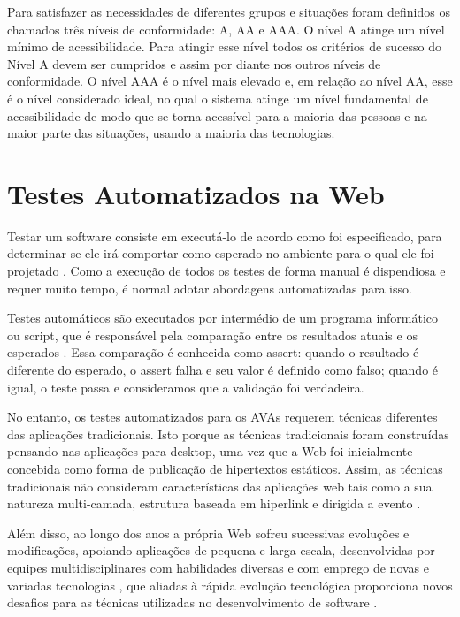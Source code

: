 \documentclass[
	12pt,				%
	openright,			%
	oneside,			%
	a4paper,			%
	chapter=TITLE,		%
	section=TITLE,		%
	subsection=TITLE,	%
	subsubsection=TITLE,%
	english,			%
	brazil				%
	]{abntex2}
\theoremstyle{definition}
\begin{document}
Para satisfazer as necessidades de diferentes grupos e situações foram definidos os chamados três níveis de conformidade: A, AA e AAA. O nível A atinge um nível mínimo de acessibilidade. Para atingir esse nível todos os critérios de sucesso do Nível A devem ser cumpridos e assim por diante nos outros níveis de conformidade. O nível AAA é o nível mais elevado e, em relação ao nível AA, esse é o nível considerado ideal, no qual o sistema atinge um nível fundamental de acessibilidade de modo que se torna acessível para a maioria das pessoas e na maior parte das situações, usando a maioria das tecnologias.

\pagebreak
 
\section{Testes Automatizados na Web}

Testar um software consiste em executá-lo de acordo como foi especificado, para determinar se ele irá comportar como esperado no ambiente para o qual ele foi projetado \cite{izabel2014testes}. Como a execução de todos os testes de forma manual é dispendiosa e requer muito tempo, é normal adotar abordagens automatizadas para isso.

Testes automáticos são executados por intermédio de um programa informático ou script, que é responsável pela comparação entre os resultados atuais e os esperados \cite{sharma2014quantitative}. Essa comparação é conhecida como assert: quando o resultado é diferente do esperado, o assert falha e seu valor é definido como falso; quando é igual, o teste passa e consideramos que a validação foi verdadeira.

No entanto, os testes automatizados para os AVAs requerem técnicas diferentes das aplicações tradicionais. Isto porque as técnicas tradicionais foram construídas pensando nas aplicações para desktop, uma vez que a Web foi inicialmente concebida como forma de publicação de hipertextos estáticos. Assim, as técnicas tradicionais não consideram características das aplicações web tais como a sua natureza multi-camada, estrutura baseada em hiperlink e dirigida a evento \cite{santa2011seleccao}.

Além disso, ao longo dos anos a própria Web sofreu sucessivas evoluções e modificações, apoiando aplicações de pequena e larga escala, desenvolvidas por equipes multidisciplinares com habilidades diversas e com emprego de novas e variadas tecnologias \cite{mendes2006need}, que aliadas à rápida evolução tecnológica proporciona novos desafios para as técnicas utilizadas no desenvolvimento de software \cite{santa2011seleccao}.
\end{document}
